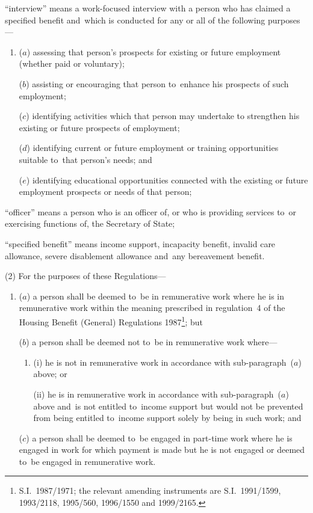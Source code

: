 \documentclass[12pt,a4paper]{article}
\begin{document}
\begin{enumerate}
“interview” means a work-focused interview with a person who has claimed a specified benefit and~which is conducted for any or all of the following purposes—
\begin{enumerate}\item[]
($a$) 
assessing that person’s prospects for existing or future employment (whether paid or voluntary);

($b$) 
assisting or encouraging that person to~enhance his prospects of such employment;

($c$) 
identifying activities which that person may undertake to strengthen his existing or future prospects of employment;

($d$) 
identifying current or future employment or training opportunities suitable to~that person’s needs; and

($e$) 
identifying educational opportunities connected with the existing or future employment prospects or needs of that person;
\end{enumerate}

“officer” means a person who is an officer of, or who is providing services to~or exercising functions of, the Secretary of State;

“specified benefit” means income support, incapacity benefit, invalid care allowance, severe disablement allowance and~any bereavement benefit.
\end{enumerate}

(2) For the purposes of these Regulations—
\begin{enumerate}\item[]
($a$) a person shall be deemed to~be in remunerative work where he is in remunerative work within the meaning prescribed in regulation~4 of the Housing Benefit (General) Regulations 1987\footnote{S.I.~1987/1971; the relevant amending instruments are S.I.~1991/1599, 1993/2118, 1995/560, 1996/1550 and 1999/2165.}; but

($b$) a person shall be deemed not to~be in remunerative work where—
\begin{enumerate}\item[]
(i) he is not in remunerative work in accordance with sub-\hspace{0pt}paragraph~($a$)  above; or

(ii) he is in remunerative work in accordance with sub-paragraph~($a$)  above and~is not entitled to~income support but would not be prevented from being entitled to~income support solely by being in such work; and
\end{enumerate}

($c$) a person shall be deemed to~be engaged in part-time work where he is engaged in work for which payment is made but he is not engaged or deemed to~be engaged in remunerative work.
\end{enumerate}
\end{document}

